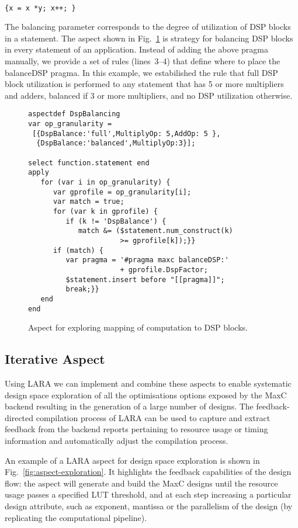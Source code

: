 \noindent\texttt{\footnotesize{} \\
\{x = x *y; x++; \}}

The balancing parameter corresponds to the degree of utilization of DSP blocks in a statement. 
The aspect shown in Fig.~\ref{fig:aspect-DSP} is strategy for balancing DSP blocks in every statement of an application. Instead
of adding the above pragma manually, we provide a set of rules (lines~3--4) that define where to place the balanceDSP pragma. In this example, we estabilished the rule that full DSP block utilization is performed to any statement that has 5 or more multipliers and adders, balanced if 3 or more multipliers, and no DSP utilization otherwise.

\lstset{style=lara}
\begin{figure}[!h]
  \centering
  \begin{lstlisting}
aspectdef DspBalancing
var op_granularity =
 [{DspBalance:'full',MultiplyOp: 5,AddOp: 5 },
  {DspBalance:'balanced',MultiplyOp:3}];

select function.statement end
apply
   for (var i in op_granularity) {
      var gprofile = op_granularity[i];
      var match = true;
      for (var k in gprofile) {
         if (k != 'DspBalance') {
            match &= ($statement.num_construct(k)
                      >= gprofile[k]);}}
      if (match) {
         var pragma = '#pragma maxc balanceDSP:'
                      + gprofile.DspFactor;
         $statement.insert before "[[pragma]]";
         break;}}
   end
end
  \end{lstlisting}
  \caption{Aspect for exploring mapping of computation to DSP blocks.}
  \label{fig:aspect-DSP}
\end{figure}

\subsection{Iterative Aspect}
\label{sect:asp_it}
Using LARA we can implement and combine these aspects to enable
systematic design space exploration of all the optimisations options
exposed by the MaxC backend resulting in the generation of a large
number of designs. The feedback-directed compilation process of LARA can
be used to capture and extract feedback from the backend reports
pertaining to resource usage or timing information and automatically
adjust the compilation process.

An example of a LARA aspect for design space exploration is
shown in Fig.~\ref{fig:aspect-exploration}. It highlights the feedback capabilities of the design
flow: the aspect will generate and build the MaxC designs until the
resource usage passes a specified LUT threshold, and at each step
increasing a particular design attribute, such as exponent, mantissa or the parallelism of the design (by replicating the computational pipeline). 

